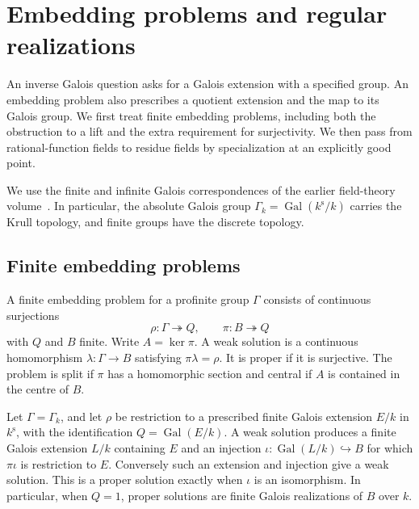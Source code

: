 \chapter{Embedding problems and regular realizations}
\label{ch:inverse-galois}

An inverse Galois question asks for a Galois extension with a specified
group. An embedding problem also prescribes a quotient extension and
the map to its Galois group. We first treat finite embedding problems,
including both the obstruction to a lift and the extra requirement for
surjectivity. We then pass from rational-function fields to residue
fields by specialization at an explicitly good point.

We use the finite and infinite Galois correspondences of
the earlier field-theory volume~\cite[Results F01, F07, T02,
C04, C06, C08--C10]{mg-aft}. In particular, the absolute Galois
group \(\Gamma_k=\operatorname{Gal}(k^{\mathrm{s}}/k)\) carries
the Krull topology, and finite groups have the discrete topology.

\section{Finite embedding problems}

\begin{definition}
\label{res:IG01}
A finite embedding problem for a profinite group \(\Gamma\)
consists of continuous surjections
\[
   \rho\colon\Gamma\twoheadrightarrow Q,\qquad
   \pi\colon B\twoheadrightarrow Q
\]
with \(Q\) and \(B\) finite. Write \(A=\ker\pi\). A weak solution is
a continuous homomorphism \(\lambda\colon\Gamma\to B\) satisfying
\(\pi\lambda=\rho\). It is proper if it is surjective. The problem is
split if \(\pi\) has a homomorphic section and central if \(A\) is
contained in the centre of \(B\).
\end{definition}

\begin{proposition}
\label{res:IG02}
Let \(\Gamma=\Gamma_k\), and let \(\rho\) be restriction to a prescribed
finite Galois extension \(E/k\) in \(k^{\mathrm{s}}\), with the
identification \(Q=\operatorname{Gal}(E/k)\). A weak solution produces
a finite Galois extension \(L/k\) containing \(E\) and an injection
\(\iota\colon\operatorname{Gal}(L/k)\hookrightarrow B\) for which
\(\pi\iota\) is restriction to \(E\). Conversely such an extension
and injection give a weak solution. This is a proper solution exactly
when \(\iota\) is an isomorphism. In particular, when \(Q=1\),
proper solutions are finite Galois realizations of \(B\) over \(k\).
\end{proposition}

